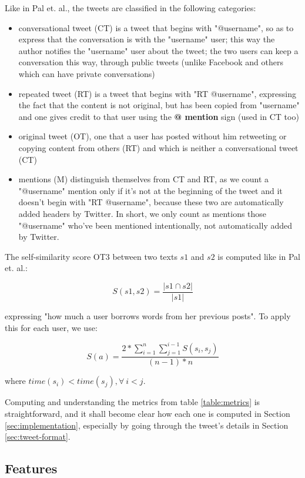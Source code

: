 Like in Pal et. al.\cite{microblogs}, the tweets are classified in the following categories:

\begin{itemize}
    \item conversational tweet (CT) is a tweet that begins with "@username", so as to express that the conversation is with the "username" user; this way the author notifies the "username" user about the tweet; the two users can keep a conversation this way, through public tweets (unlike Facebook and others which can have private conversations)
    \item repeated tweet (RT) is a tweet that begins with "RT @username", expressing the fact that the content is not original, but has been copied from "username" and one gives credit to that user using the \textbf{@ mention} sign (used in CT too)
	\item original tweet (OT), one that a user has posted without him retweeting or copying content from others (RT) and which is neither a conversational tweet (CT)
    \item mentions (M) distinguish themselves from CT and RT, as we count a "@username" mention only if it's not at the beginning of the tweet and it doesn't begin with "RT @username", because these two are automatically added headers by Twitter. In short, we only count as mentions those "@username" who've been mentioned intentionally, not automatically added by Twitter.
\end{itemize}

The self-similarity score OT3 between two texts $s1$ and $s2$ is computed like in Pal et. al.\cite{microblogs}:

$$S(s1, s2) = \frac{|s1 \cap s2|}{|s1|}$$

expressing "how much a user borrows words from her previous posts". To apply this for each user, we use:

$$S(a) = \frac{2 * \sum_{i=1}^n\sum_{j=1}^{i-1}S(s_i,s_j)}{(n-1) * n}$$

where $time(s_i) < time(s_j), \forall\ i < j$.

Computing and understanding the metrics from table \ref{table:metrics} is straightforward, and it shall become clear how each one is computed in Section \ref{sec:implementation}, especially by going through the tweet's details in Section \ref{sec:tweet-format}.

\subsection{Features}
\label{sec:features}

